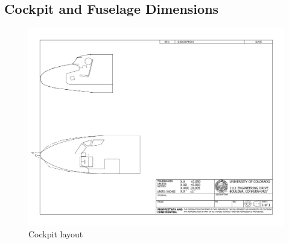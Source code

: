 \documentclass[conf]{new-aiaa}
\begin{document}
\subsection*{Cockpit and Fuselage Dimensions}
\begin{figure}[H]
    \centering
    \includegraphics[angle=90, width=\textwidth]{plots/cockpit}
    \caption{Cockpit layout}
    \label{fig:cockpit}
\end{figure}
\end{document}
